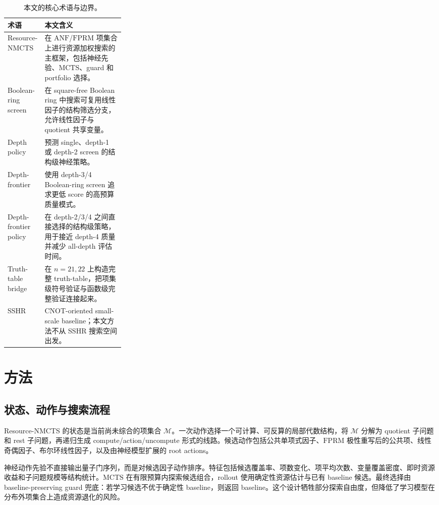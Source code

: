 \documentclass[UTF8,fontset=macnew,11pt]{ctexart}
\newcommand{\method}{Resource-NMCTS}
\newcommand{\screen}{Boolean-ring screen}
\newcommand{\anf}{\ensuremath{\mathrm{ANF}}}
\newcommand{\fprm}{\ensuremath{\mathrm{FPRM}}}
\newcommand{\mcts}{\ensuremath{\mathrm{MCTS}}}
\newcommand{\ttable}{truth-table}
\begin{document}
\begin{table}[t]
\centering
\small
\caption{本文的核心术语与边界。}
\label{tab:terms}
\begin{tabularx}{\linewidth}{>{\raggedright\arraybackslash}p{0.27\linewidth}>{\raggedright\arraybackslash}X}
\toprule
术语 & 本文含义 \\
\midrule
\method{} & 在 \anf{}/\fprm{} 项集合上进行资源加权搜索的主框架，包括神经先验、\mcts{}、guard 和 portfolio 选择。 \\
\screen{} & 在 square-free Boolean ring 中搜索可复用线性因子的结构筛选分支，允许线性因子与 quotient 共享变量。 \\
Depth policy & 预测 single、depth-1 或 depth-2 screen 的结构级神经策略。 \\
Depth-frontier & 使用 depth-3/4 \screen{} 追求更低 score 的高预算质量模式。 \\
Depth-frontier policy & 在 depth-2/3/4 之间直接选择的结构级策略，用于接近 depth-4 质量并减少 all-depth 评估时间。 \\
Truth-table bridge & 在 $n=21,22$ 上构造完整 \ttable{}，把项集级符号验证与函数级完整验证连接起来。 \\
SSHR & CNOT-oriented small-scale baseline；本文方法不从 SSHR 搜索空间出发。 \\
\bottomrule
\end{tabularx}
\end{table}

\section{方法}

\subsection{状态、动作与搜索流程}

\method{} 的状态是当前尚未综合的项集合 $\mathcal{M}$。一次动作选择一个可计算、可反算的局部代数结构，将 $\mathcal{M}$ 分解为 quotient 子问题和 rest 子问题，再递归生成 compute/action/uncompute 形式的线路。候选动作包括公共单项式因子、\fprm{} 极性重写后的公共项、线性奇偶因子、布尔环线性因子，以及由神经模型扩展的 root actions。

神经动作先验不直接输出量子门序列，而是对候选因子动作排序。特征包括候选覆盖率、项数变化、项平均次数、变量覆盖密度、即时资源收益和子问题规模等结构统计。\mcts{} 在有限预算内探索候选组合，rollout 使用确定性资源估计与已有 baseline 候选。最终选择由 baseline-preserving guard 兜底：若学习候选不优于确定性 baseline，则返回 baseline。这个设计牺牲部分探索自由度，但降低了学习模型在分布外项集合上造成资源退化的风险。
\end{document}
